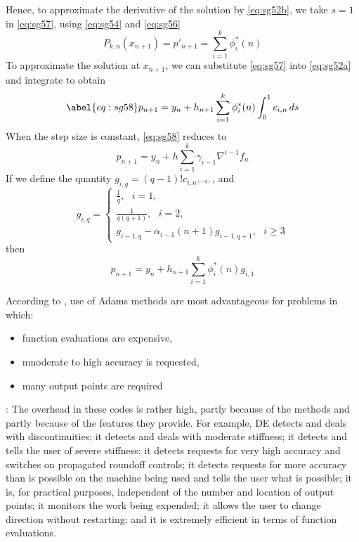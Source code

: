 Hence, to approximate the derivative of the solution by \autoref{eq:sg52b}, we 
take $s=1$ in \autoref{eq:sg57}, using \autoref{eq:sg54} and \autoref{eq:sg56}
\begin{equation}
  P_{k,n} (x_{n+1}) = p'_{n+1} = \sum^{k}_{i=1} \phi^{*}_{i} (n)
\end{equation}
To approximate the solution at $x_{n+1}$, we can substitute \autoref{eq:sg57} 
into \autoref{eq:sg52a} and integrate to obtain
\begin{equation}\abel{eq:sg58}
  p_{n+1} = y_n + h_{n+1} \sum_{i=1}^{k} \phi ^{*}_{i} (n) \int_{0}^{1} c_{i,n} \,ds
\end{equation}
When the step size is constant, \autoref{eq:sg58} reduces to
\begin{equation}
  p_{n+1} = y_n +h \sum_{i=1}^{k} \gamma _{i-1} \nabla ^{i-1} f_n
\end{equation}
If we define the quantity $g_{i,q}=(q-1)!c_{i,n^{(-q)}}$, and 
\begin{equation}\label{eq:sg510}
  g_{i,q} = \begin{cases}
    \frac{1}{q}, \text{ } i=1,\\
    \frac{1}{q(q+1)}, \text{ } i=2,\\
    g_{i-1,q} - \alpha_{i-1}(n+1)g_{i-1,q+1}, \text{ } i \ge 3
  \end{cases}
\end{equation}
then
\begin{equation}\label{eq:sg511}
  p_{n+1} = y_n + h_{n+1} 
    \sum_{i=1}^{k} \phi ^{*}_{i} (n) g_{i,1}
\end{equation}

According to \cite{Shampine1975}, use of Adams methods are most advantageous for 
problems in which:
\begin{itemize}
    \item function evaluations are expensive,
    \item mnoderate to high accuracy is requested,
    \item many output points are required
\end{itemize}

\cite{Shampine1975}:
The overhead in these codes is rather high, partly because of the methods
and partly because of the features they provide. For example, DE detects
and deals with discontinuities; it detects and deals with moderate stiffness;
it detects and tells the user of severe stiffness; it detects requests for very
high accuracy and switches on propagated roundoff controls; it detects
requests for more accuracy than is possible on the machine being used and
tells the user what is possible; it is, for practical purposes, independent
of the number and location of output points; it monitors the work being
expended; it allows the user to change direction without restarting; and
it is extremely efficient in terms of function evaluations. 
